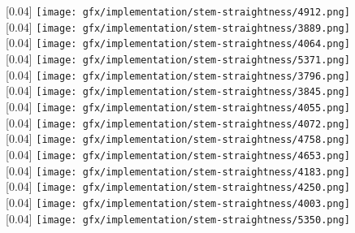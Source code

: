 \begin{figure}[h!]
  \centering
  \tiny
  \captionsetup[subfigure]{labelformat=empty}

  [0.04\linewidth]{
    \texttt{[image: gfx/implementation/stem-straightness/4912.png]}
  }
  [0.04\linewidth]{
    \texttt{[image: gfx/implementation/stem-straightness/3889.png]}
  }
  [0.04\linewidth]{
    \texttt{[image: gfx/implementation/stem-straightness/4064.png]}
  }
  [0.04\linewidth]{
    \texttt{[image: gfx/implementation/stem-straightness/5371.png]}
  }
  [0.04\linewidth]{
    \texttt{[image: gfx/implementation/stem-straightness/3796.png]}
  }
  [0.04\linewidth]{
    \texttt{[image: gfx/implementation/stem-straightness/3845.png]}
  }
  [0.04\linewidth]{
    \texttt{[image: gfx/implementation/stem-straightness/4055.png]}
  }
  [0.04\linewidth]{
    \texttt{[image: gfx/implementation/stem-straightness/4072.png]}
  }
  [0.04\linewidth]{
    \texttt{[image: gfx/implementation/stem-straightness/4758.png]}
  }
  [0.04\linewidth]{
    \texttt{[image: gfx/implementation/stem-straightness/4653.png]}
  }
  [0.04\linewidth]{
    \texttt{[image: gfx/implementation/stem-straightness/4183.png]}
  }
  [0.04\linewidth]{
    \texttt{[image: gfx/implementation/stem-straightness/4250.png]}
  }
  [0.04\linewidth]{
    \texttt{[image: gfx/implementation/stem-straightness/4003.png]}
  }
  [0.04\linewidth]{
    \texttt{[image: gfx/implementation/stem-straightness/5350.png]}
}
\end{figure}
